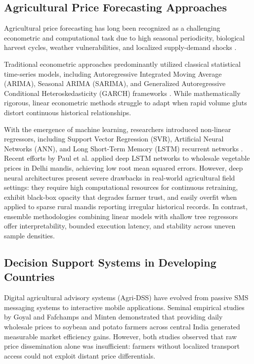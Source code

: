 \documentclass[conference]{IEEEtran}
\begin{document}
\subsection{Agricultural Price Forecasting Approaches}
Agricultural price forecasting has long been recognized as a challenging econometric and computational task due to high seasonal periodicity, biological harvest cycles, weather vulnerabilities, and localized supply-demand shocks \cite{b3, b4}. 

Traditional econometric approaches predominantly utilized classical statistical time-series models, including Autoregressive Integrated Moving Average (ARIMA), Seasonal ARIMA (SARIMA), and Generalized Autoregressive Conditional Heteroskedasticity (GARCH) frameworks \cite{b8}. While mathematically rigorous, linear econometric methods struggle to adapt when rapid volume gluts distort continuous historical relationships. 

With the emergence of machine learning, researchers introduced non-linear regressors, including Support Vector Regression (SVR), Artificial Neural Networks (ANN), and Long Short-Term Memory (LSTM) recurrent networks \cite{b9, b10}. Recent efforts by Paul et al. \cite{b11} applied deep LSTM networks to wholesale vegetable prices in Delhi mandis, achieving low root mean squared errors. However, deep neural architectures present severe drawbacks in real-world agricultural field settings: they require high computational resources for continuous retraining, exhibit black-box opacity that degrades farmer trust, and easily overfit when applied to sparse rural mandis reporting irregular historical records. In contrast, ensemble methodologies combining linear models with shallow tree regressors \cite{b5, b12} offer interpretability, bounded execution latency, and stability across uneven sample densities.

\subsection{Decision Support Systems in Developing Countries}
Digital agricultural advisory systems (Agri-DSS) have evolved from passive SMS messaging systems to interactive mobile applications. Seminal empirical studies by Goyal \cite{b13} and Fafchamps and Minten \cite{b14} demonstrated that providing daily wholesale prices to soybean and potato farmers across central India generated measurable market efficiency gains. However, both studies observed that raw price dissemination alone was insufficient: farmers without localized transport access could not exploit distant price differentials.
\end{document}
